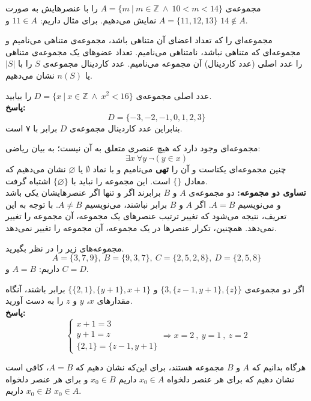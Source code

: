 \begin{example}
	مجموعه‌ی
	$A = \{m \ | \ m \in \mathbb{Z} \ \wedge \ 10<m<14\}$
	را با عنصرهایش به صورت
	$A = \{11, 12, 13\}$
	نمایش می‌دهیم. برای مثال داریم:
	$11 \in A$ و
	$14 \notin A$.
\end{example}
\smallskip
مجموعه‌ای را که تعداد اعضای آن متناهی باشد، مجموعه‌ی متناهی می‌نامیم و مجموعه‌ای که متناهی نباشد، نامتناهی می‌نامیم. تعداد عضوهای یک مجموعه‌ی متناهی را عدد اصلی (عدد کاردینال) آن مجموعه می‌نامیم. عدد کاردینال مجموعه‌ی $S$ را با
$|S|$ یا $n(S)$
نشان می‌دهیم.
\begin{example}
	عدد اصلی مجموعه‌ی
	$D = \{x \ | \ x \in \mathbb{Z} \ \wedge \ x^2<16\}$
	را بیابید.
	\\ \textbf{پاسخ:}
	$$D = \{-3,-2,-1,0,1,2,3\}$$
	بنابراین عدد کاردینال مجموعه‌ی $D$ برابر با ۷ است.
\end{example}
\smallskip
مجموعه‌ای وجود دارد که هیچ عنصری متعلق به آن نیست؛ به بیان ریاضی:
$$\exists x \ \forall y \ \neg(y \in x)$$
چنین مجموعه‌ای یکتاست و آن را
\textbf{تهی}
می‌نامیم و با نماد
$\emptyset$ یا $\varnothing$
نشان می‌دهیم که معادل
$\{\}$
است. این مجموعه را نباید با
$\{\varnothing\}$
اشتباه گرفت. \\
\textbf{تساوی دو مجموعه:}
دو مجموعه‌ی $A$ و $B$ برابرند اگر و تنها اگر عنصرهایشان یکی باشد و می‌نویسیم
$A=B$.
اگر $A$ و $B$ برابر نباشند، می‌نویسیم
$A \neq B$.
با توجه به این تعریف، نتیجه می‌شود که تغییر ترتیب عنصرهای یک مجموعه، آن مجموعه را تغییر نمی‌دهد. همچنین، تکرار عنصرها در یک مجموعه، آن مجموعه را تغییر نمی‌دهد.
\begin{example}
	مجموعه‌های زیر را در نظر بگیرید.
	$$A=\{3,7,9\}, \ B=\{9,3,7\}, \ C=\{2,5,2,8\}, \ D=\{2,5,8\}$$
	داریم:
	$A=B$ و $C=D$.
\end{example}
\begin{example}
	اگر دو مجموعه‌ی
	$\{3,\{z-1,y+1\},\{z\}\}$
	 و
	$\{\{2,1\},\{y+1\},x+1\}$
	 برابر باشند، آنگاه مقدارهای
	$x$، $y$ و $z$
	را به دست آورید.
	\\ \textbf{پاسخ:}
	\[
	\begin{cases}
		x+1=3 \\
		y+1=z \\
		\{2,1\}=\{z-1,y+1\}
	\end{cases}
	\Rightarrow
	x=2 \ , \ y=1 \ , \ z=2
	\]
\end{example}
\smallskip
هرگاه بدانیم که $A$ و $B$ مجموعه هستند، برای این‌که نشان دهیم که
$A=B$،
کافی است نشان دهیم که برای هر عنصر دلخواه
$x_0 \in A$
داریم
$x_0 \in B$
و برای هر عنصر دلخواه
$x_0 \in B$
داریم
$x_0 \in A$.
\\
